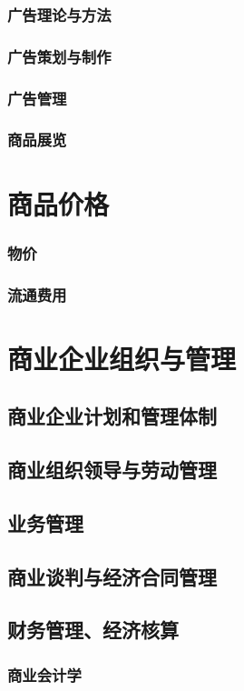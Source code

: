 \documentclass[UTF8]{../../RepresentationUniverse}
\begin{document}
        \subsubsection{广告理论与方法}
        \subsubsection{广告策划与制作}
        \subsubsection{广告管理}
        \subsubsection{商品展览}
\section{商品价格}
    \subsubsection{物价}
    \subsubsection{流通费用}
\section{商业企业组织与管理}
    \subsection{商业企业计划和管理体制}
    \subsection{商业组织领导与劳动管理}
    \subsection{业务管理}
    \subsection{商业谈判与经济合同管理}
    \subsection{财务管理、经济核算}
        \subsubsection{商业会计学}
\end{document}
